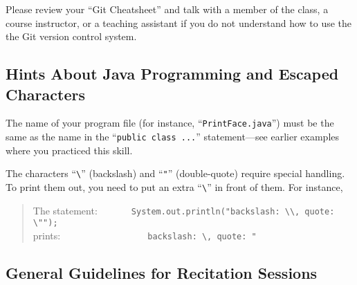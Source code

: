 Please review your ``Git Cheatsheet'' and talk with a member of the class, a course instructor, or a teaching assistant
if you do not understand how to use the the Git version control system.

\vspace*{-.1in}
\subsection*{Hints About Java Programming and Escaped Characters}

The name of your program file (for instance, ``{\tt PrintFace.java}'') must be the same as the name in the ``{\tt public
  class ...}'' statement---see earlier examples where you practiced this skill.

The characters ``\verb$\$'' (backslash) and ``\verb$"$'' (double-quote)
require special handling. To print them out, you need to put an extra
``\verb$\$'' in front of them. For instance,
\begin{quote}
The statement:\ \ \ \ \ \ \ \verb$System.out.println("backslash: \\, quote: \"");$\\
prints:\ \ \ \ \ \ \ \ \ \ \ \ \ \ \ \ \ \ 
\verb$backslash: \, quote: "$
\end{quote}

\vspace*{-.2in}
\subsection*{General Guidelines for Recitation Sessions}


